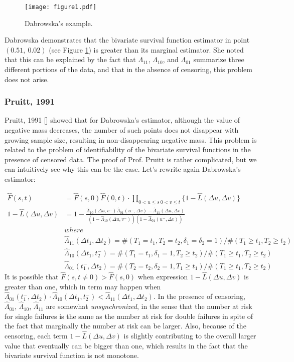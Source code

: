 \documentclass[]{article}
\begin{document}
\begin{figure}[!h]
\texttt{[image: figure1.pdf]}
\caption{Dabrowska's example.}
\label{fig:bubbles}
\end{figure}
\clearpage

Dabrowska demonstrates that the bivariate survival function estimator in point $(0.51,~0.02)$ (see Figure \ref{fig:bubbles}) is greater than its marginal estimator. She noted that this can be explained by the fact that $\Lambda_{11}$, $\Lambda_{10}$, and $\Lambda_{01}$ summarize three different portions of the data, and that in the absence of censoring, this problem does not arise.

\subsubsection{Pruitt, 1991 \cite{pruitt1991negative}}
Pruitt, 1991 [\cite{pruitt1991negative}] showed that for Dabrowska's estimator, although the value of negative mass decreases, the number of such points does not disappear with growing sample size, resulting in non-disappearing negative mass. This problem is related to the problem of identifiability of the bivariate survival functions in the presence of censored data. The proof of Prof. Pruitt is rather complicated, but we can intuitively see why this can be the case. Let's rewrite again Dabrowska's estimator:

	$$
	\begin{aligned}
		\hat{F}(s,t) &= \hat{F}(s,0)\hat{F}(0,t)\cdot \prod_{{0<u\leq s~0<v\leq t}}\{1 - \hat{L}(\Delta u, \Delta v)\}\\
    1 - \hat{L}(\Delta u, \Delta v) &= 1 - \frac{\hat{\Lambda}_{10}(\Delta u,v^-)\hat{\Lambda}_{01}(u^-,\Delta v) - \hat{\Lambda}_{11}(\Delta u,\Delta v)}{\left(1-\hat{\Lambda}_{10}(\Delta u,v^-)\right)\left(1-\hat{\Lambda}_{01}(u^-,\Delta v)\right)}\\
  &where\\
	&\hat{\Lambda}_{11}(\Delta t_1, \Delta t_2) = \#(T_1=t_1, T_2=t_2, \delta_1=\delta_2=1)/\#(T_1\geq t_1, T_2\geq t_2)\\
	&\hat{\Lambda}_{10}(\Delta t_1, t_2^-) = \#(T_1=t_1, \delta_1=1, T_2\geq t_2)/\#(T_1\geq t_1, T_2\geq t_2)\\
	&\hat{\Lambda}_{01}(t_1^-,\Delta  t_2) = \#(T_2=t_2, \delta_2=1, T_1\geq t_1)/\#(T_1\geq t_1, T_2\geq t_2)		
	\end{aligned}
	$$
It is possible that $\hat{F}(s,t\neq 0) > \hat{F}(s,0)$ when expression $1 - \hat{L}(\Delta u, \Delta v)$ is greater than one, which in term may happen when  $\hat{\Lambda}_{01}(t_1^-,\Delta  t_2) \cdot \hat{\Lambda}_{10}(\Delta t_1, t_2^-)< \hat{\Lambda}_{11}(\Delta t_1, \Delta t_2)$. In the presence of censoring, $\hat{\Lambda}_{01}$, $\hat{\Lambda}_{10}$, $\hat{\Lambda}_{11}$ are somewhat \emph{unsynchronized}, in the sense that the number at risk for single failures is the same as the number at risk for double failures in spite of the fact that marginally the number at risk can be larger. Also, because of the censoring, each term $1 - \hat{L}(\Delta u, \Delta v)$ is slightly contributing to the overall larger value that eventually can be bigger than one, which results in the fact that the bivariate survival function is not monotone.
\end{document}
